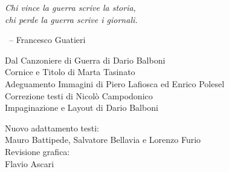 \begin{myquote}\it
  Chi vince la guerra scrive la storia,\\
  chi perde la guerra scrive i giornali.
  
  {~\hfill\normalfont -- Francesco Guatieri}
\end{myquote}

\vfill

\begin{adjustwidth}{\sectionnumlen}{}\fontsize{10}{11}\selectfont
  Dal Canzoniere di Guerra di Dario Balboni\\
  {\fontsize{8}{10}\selectfont
	  Cornice e Titolo di Marta Tasinato\\
	  Adeguamento Immagini di Piero Lafiosca ed Enrico Polesel\\
	  Correzione testi di Nicolò Campodonico\\
	  Impaginazione e Layout di Dario Balboni\\
  }

  Nuovo adattamento testi:\\
  Mauro Battipede, Salvatore Bellavia e Lorenzo Furio\\
  Revisione grafica:\\
  Flavio Ascari
\end{adjustwidth}
\clearpage

